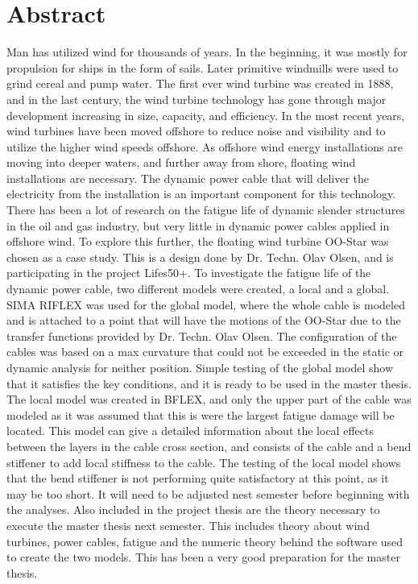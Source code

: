 \chapter*{Abstract}
Man has utilized wind for thousands of years. In the beginning, it was mostly for propulsion for ships in the form of sails. Later primitive windmills were used to grind cereal and pump water. The first ever wind turbine was created in 1888, and in the last century, the wind turbine technology has gone through major development increasing in size, capacity, and efficiency. In the most recent years, wind turbines have been moved offshore to reduce noise and visibility and to utilize the higher wind speeds offshore. As offshore wind energy installations are moving into deeper waters, and further away from shore, floating wind installations are necessary. The dynamic power cable that will deliver the electricity from the installation is an important component for this technology. There has been a lot of research on the fatigue life of dynamic slender structures in the oil and gas industry, but very little in dynamic power cables applied in offshore wind. \newline
\newline
 To explore this further, the floating wind turbine OO-Star was chosen as a case study. This is a design done by Dr. Techn. Olav Olsen, and is participating in the project Lifes50+. To investigate the fatigue life of the dynamic power cable, two different models were created, a local and a global. SIMA RIFLEX was used for the global model, where the whole cable is modeled and is attached to a point that will have the motions of the OO-Star due to the transfer functions provided by Dr. Techn. Olav Olsen. The configuration of the cables was based on a max curvature that could not be exceeded in the static or dynamic analysis for neither position. Simple testing of the global model show that it satisfies the key conditions, and it is ready to be used in the master thesis.  The local model was created in BFLEX, and only the upper part of the cable was modeled as it was assumed that this is were the largest fatigue damage will be located. This model can give a detailed information about the local effects between the layers in the cable cross section, and consists of the cable and a bend stiffener to add local stiffness to the cable. The testing of the local model shows that the bend stiffener is not performing quite satisfactory at this point, as it may be too short. It will need to be adjusted nest semester before beginning with the analyses.\newline 
\newline
Also included in the project thesis are the theory necessary to execute the master thesis next semester. This includes theory about wind turbines, power cables, fatigue and the numeric theory behind the software used to create the two models. This has been a very good preparation for the master thesis.
